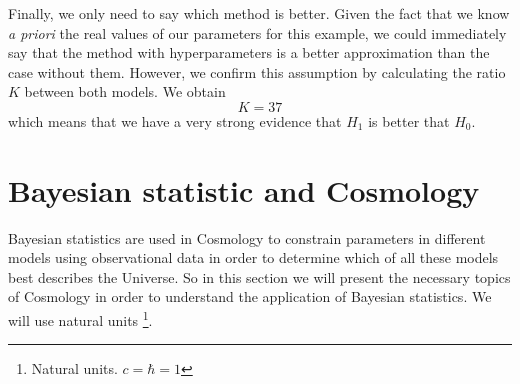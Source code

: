 \documentclass[onecolumn,           %
               showpacs,            %
               preprintnumbers,     %
               aps,                 %
               letterpaper,             %
               superscriptaddress,      %
               nofootinbib,         %
               tightenlines,        %
               floats,floatfix      %
               ,usenatbib,
               ]{revtex4-1}
\begin{document}
Finally, we only need to say which method is better. Given the fact that we know \textit{a priori} the real values of our parameters for this example, we could immediately say that the method with hyperparameters is a better approximation than the case without them. However, we confirm this assumption by calculating the ratio $K$ between both models. We obtain
\begin{equation}
K = 37
\end{equation}
which means that we have a very strong evidence that $H_1$ is better that $H_0$.

\section{Bayesian statistic and Cosmology}


Bayesian statistics are used in Cosmology to constrain parameters in different models using observational data in order to determine which of all these models best describes the Universe. So in this section we will present the necessary topics of Cosmology in order to understand the application of Bayesian statistics. We will use natural units \footnote{Natural units. $c=\hbar=1$}.
\end{document}
